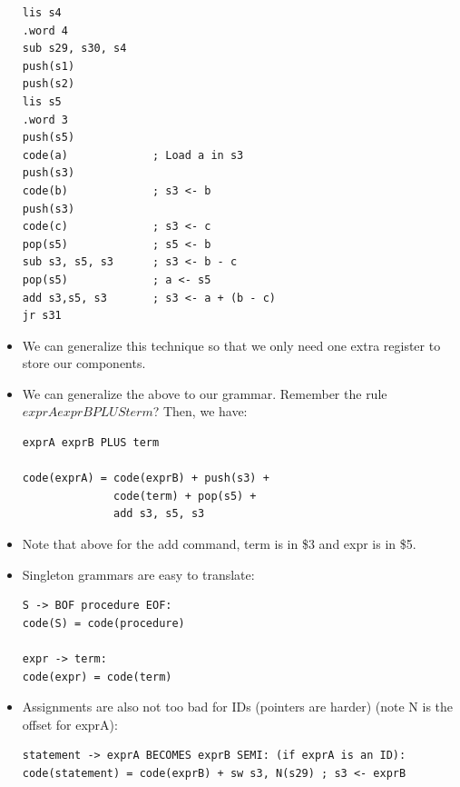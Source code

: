 \documentclass[12pt]{article}
\begin{document}
\begin{itemize}
\begin{lstlisting}[mathescape, numbers=none, breaklines=true]
lis s4
.word 4
sub s29, s30, s4
push(s1)
push(s2)
lis s5
.word 3
push(s5)
code(a)             ; Load a in s3
push(s3)            
code(b)             ; s3 <- b
push(s3)
code(c)             ; s3 <- c
pop(s5)             ; s5 <- b
sub s3, s5, s3      ; s3 <- b - c
pop(s5)             ; a <- s5
add s3,s5, s3       ; s3 <- a + (b - c)
jr s31
\end{lstlisting}
    \item We can generalize this technique so that we only need one extra register to store our components.
    \item We can generalize the above to our grammar.  Remember the rule $exprA exprB PLUS term$?  Then, we have:
\begin{lstlisting}[mathescape, numbers=none, breaklines=true]
exprA exprB PLUS term

code(exprA) = code(exprB) + push(s3) +
              code(term) + pop(s5) +
              add s3, s5, s3
\end{lstlisting}
    \item Note that above for the add command, term is in \$3 and expr is in \$5.
    \item Singleton grammars are easy to translate:
\begin{lstlisting}[mathescape, numbers=none, breaklines=true]
S -> BOF procedure EOF:
code(S) = code(procedure)

expr -> term:
code(expr) = code(term)
\end{lstlisting}
    \item Assignments are also not too bad for IDs (pointers are harder) (note N is the offset for exprA):
\begin{lstlisting}[mathescape, numbers=none, breaklines=true]
statement -> exprA BECOMES exprB SEMI: (if exprA is an ID):
code(statement) = code(exprB) + sw s3, N(s29) ; s3 <- exprB
\end{lstlisting}
\end{itemize}
\end{document}
